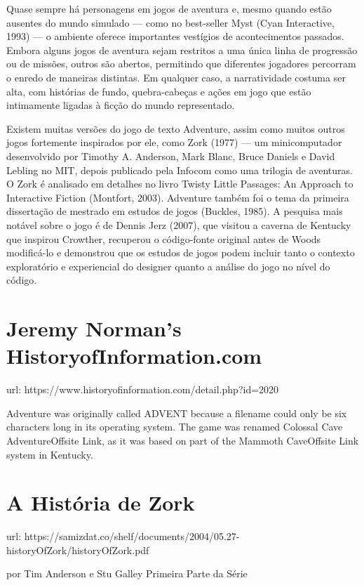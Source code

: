 \documentclass[12pt,a4paper]{article}
\begin{document}
Quase sempre há personagens em jogos de aventura e, mesmo quando estão ausentes do mundo simulado — como no best-seller Myst (Cyan Interactive, 1993) — o ambiente oferece importantes vestígios de acontecimentos passados.
Embora alguns jogos de aventura sejam restritos a uma única linha de progressão ou de missões, outros são abertos, permitindo que diferentes jogadores percorram o enredo de maneiras distintas. Em qualquer caso, a narratividade costuma ser alta, com histórias de fundo, quebra-cabeças e ações em jogo que estão intimamente ligadas à ficção do mundo representado.

Existem muitas versões do jogo de texto Adventure, assim como muitos outros jogos fortemente inspirados por ele, como Zork (1977) — um minicomputador desenvolvido por Timothy A. Anderson, Mark Blanc, Bruce Daniels e David Lebling no MIT, depois publicado pela Infocom como uma trilogia de aventuras.
O Zork é analisado em detalhes no livro Twisty Little Passages: An Approach to Interactive Fiction (Montfort, 2003).
Adventure também foi o tema da primeira dissertação de mestrado em estudos de jogos (Buckles, 1985).
A pesquisa mais notável sobre o jogo é de Dennis Jerz (2007), que visitou a caverna de Kentucky que inspirou Crowther, recuperou o código-fonte original antes de Woods modificá-lo e demonstrou que os estudos de jogos podem incluir tanto o contexto exploratório e experiencial do designer quanto a análise do jogo no nível do código.

\section{Jeremy Norman’s HistoryofInformation.com}

url: https://www.historyofinformation.com/detail.php?id=2020

Adventure was originally called ADVENT because a filename could only be six characters long in its operating system.  The game was renamed Colossal Cave AdventureOffsite Link, as it was based on part of the Mammoth CaveOffsite Link system in Kentucky.

\section{A História de Zork}

url: https://samizdat.co/shelf/documents/2004/05.27-historyOfZork/historyOfZork.pdf

por Tim Anderson e Stu Galley
Primeira Parte da Série
\end{document}
